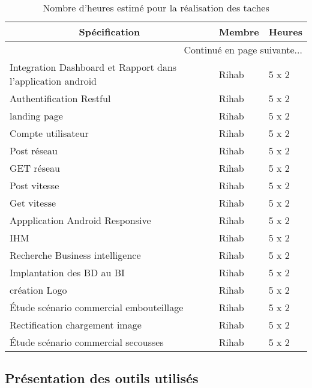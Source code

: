 \begin{center}
    \begin{longtable}{| l | l | l |}
        \caption{Nombre d'heures estimé pour la réalisation des taches}
        \label{tab:sprint3-estimation} \\

 \hline
 \multicolumn{1}{|c}{\textbf{Spécification}} &
 \multicolumn{1}{|c}{\textbf{Membre}} &
 \multicolumn{1}{|c|}{\textbf{Heures}} \\ \hline
 \endhead

 \hline \multicolumn{3}{|r|}{{Continué en page suivante$\dotsc$}} \\ \hline
 \endfoot

 \hline \hline
 \endlastfoot

\hline
Integration Dashboard et Rapport dans l'application android & Rihab & 5 x 2 \\ \hline
Authentification Restful& Rihab & 5 x 2 \\ \hline
landing page& Rihab & 5 x 2 \\ \hline
Compte utilisateur& Rihab & 5 x 2 \\ \hline
Post réseau& Rihab & 5 x 2 \\ \hline
GET réseau& Rihab & 5 x 2 \\ \hline
Post vitesse& Rihab & 5 x 2 \\ \hline
Get vitesse& Rihab & 5 x 2 \\ \hline
Appplication Android Responsive & Rihab & 5 x 2 \\ \hline
IHM & Rihab & 5 x 2 \\ \hline
Recherche Business intelligence& Rihab & 5 x 2 \\ \hline
Implantation des BD au BI& Rihab & 5 x 2 \\ \hline
création Logo& Rihab & 5 x 2 \\ \hline
Étude scénario commercial embouteillage& Rihab & 5 x 2 \\ \hline
Rectification chargement image & Rihab & 5 x 2 \\ \hline
Étude scénario commercial secousses & Rihab & 5 x 2 \\ \hline
\end{longtable}
\end{center}

\subsection{Présentation des outils utilisés}
